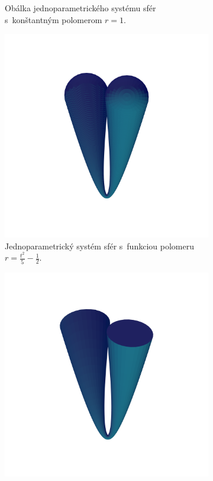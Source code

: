 \documentclass[12pt, twoside]{book}
\begin{document}
\begin{figure}[h]
\begin{subfigure}[t]{0.49\textwidth}
		\caption{Obálka jednoparametrického systému sfér s~konštantným polomerom $r=1$.}
        \label{fig:plocha2}
    \end{subfigure}
    \hfill
    \begin{subfigure}[t]{0.49\textwidth}
        \centering
        \includegraphics[width=\textwidth, trim=0mm 50mm 0mm 50mm, clip=true]{images/bienert_function_radius_spheres.png}
        	\caption{Jednoparametrický systém sfér s~funkciou polomeru $r=\frac{t^2}{5}-\frac{1}{2}$.}
        \label{fig:plocha3}
    \end{subfigure}
    \hfill
    \begin{subfigure}[t]{0.49\textwidth}
        \centering
        \includegraphics[width=\textwidth, trim=0mm 50mm 0mm 50mm, clip=true]{images/bienert_function_radius_envelope.png}

\end{subfigure}
\end{figure}
\end{document}
